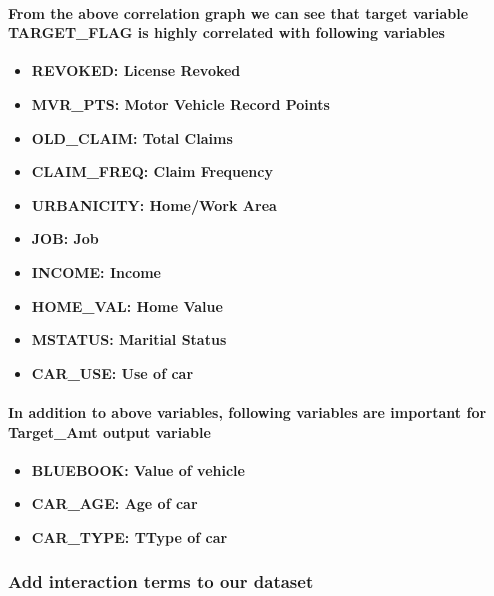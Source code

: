 \documentclass[]{article}
\providecommand{\tightlist}{%
  \setlength{\itemsep}{0pt}\setlength{\parskip}{0pt}}
\let\oldparagraph\paragraph
\renewcommand{\paragraph}[1]{\oldparagraph{#1}\mbox{}}
\begin{document}
\hypertarget{from-the-above-correlation-graph-we-can-see-that-target-variable-target_flag-is-highly-correlated-with-following-variables}{%
\paragraph{From the above correlation graph we can see that target
variable TARGET\_FLAG is highly correlated with following
variables}\label{from-the-above-correlation-graph-we-can-see-that-target-variable-target_flag-is-highly-correlated-with-following-variables}}

\begin{itemize}
\tightlist
\item
  \textbf{REVOKED: License Revoked}
\item
  \textbf{MVR\_PTS: Motor Vehicle Record Points}
\item
  \textbf{OLD\_CLAIM: Total Claims}
\item
  \textbf{CLAIM\_FREQ: Claim Frequency}
\item
  \textbf{URBANICITY: Home/Work Area}
\item
  \textbf{JOB: Job}
\item
  \textbf{INCOME: Income}
\item
  \textbf{HOME\_VAL: Home Value}
\item
  \textbf{MSTATUS: Maritial Status}
\item
  \textbf{CAR\_USE: Use of car}
\end{itemize}

\hypertarget{in-addition-to-above-variables-following-variables-are-important-for-target_amt-output-variable}{%
\paragraph{In addition to above variables, following variables are
important for Target\_Amt output
variable}\label{in-addition-to-above-variables-following-variables-are-important-for-target_amt-output-variable}}

\begin{itemize}
\tightlist
\item
  \textbf{BLUEBOOK: Value of vehicle}
\item
  \textbf{CAR\_AGE: Age of car}
\item
  \textbf{CAR\_TYPE: TType of car}
\end{itemize}

\hypertarget{add-interaction-terms-to-our-dataset}{%
\subsubsection{\texorpdfstring{\textbf{Add interaction terms to our
dataset}}{Add interaction terms to our dataset}}\label{add-interaction-terms-to-our-dataset}}
\end{document}
